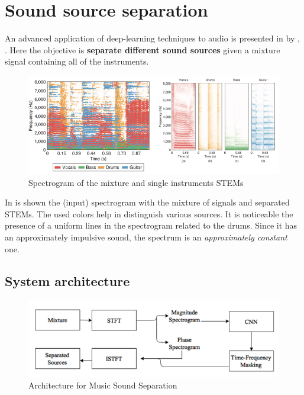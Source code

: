 \section{Sound source separation\cite{cano2018musical}}
An advanced application of deep-learning techniques to audio is presented in  by , \cite{cano2018musical}. Here the objective is \textbf{separate different sound sources} given a mixture signal containing all of the instruments.

\begin{figure}[h]
    \centering
    \includegraphics[scale=0.8]{img/MSS.png}
    \caption{Spectrogram of the mixture and single instruments STEMs}
    \label{fig:MSS}
\end{figure}

In  is shown the (input) spectrogram with the mixture of signals and separated STEMs. The used colors help in distinguish various sources. It is noticeable the presence of a uniform lines in the spectrogram related to the drums. Since it has an approximately impulsive sound, the spectrum is an \textit{approximately constant} one.

\subsection{System architecture}

\begin{figure}
    \centering
    \includegraphics[scale=1.1]{img/SysArch_MSS.png}
    \caption{Architecture for Music Sound Separation}
\end{figure}

